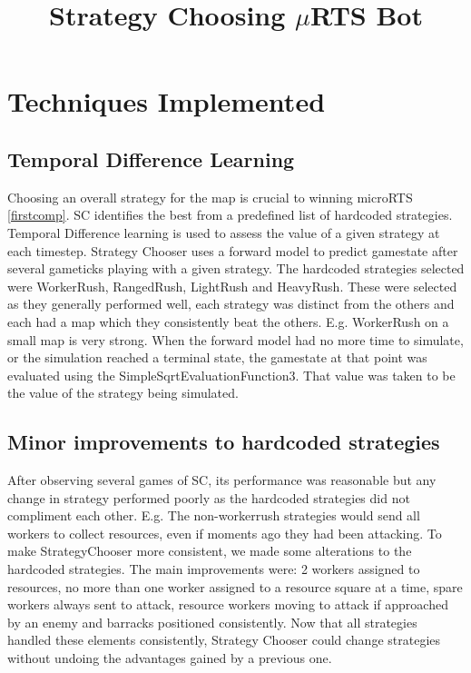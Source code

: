 \documentclass[]{article}
\title{Strategy Choosing $\mu$RTS Bot}
\author{}
\begin{document}
\maketitle

\begin{abstract}

\end{abstract}

\section{Techniques Implemented}


\subsection{Temporal Difference Learning}
Choosing an overall strategy for the map is crucial to winning microRTS \ref{firstcomp}. SC identifies the best from a predefined list of hardcoded strategies. Temporal Difference learning is used to assess the value of a given strategy at each timestep. Strategy Chooser uses a forward model to predict gamestate after several gameticks playing with a given strategy. The hardcoded strategies selected were WorkerRush, RangedRush, LightRush and HeavyRush. These were selected as they generally performed well, each strategy was distinct from the others and each had a map which they consistently beat the others. E.g. WorkerRush on a small map is very strong. When the forward model had no more time to simulate, or the simulation reached a terminal state, the gamestate at that point was evaluated using the SimpleSqrtEvaluationFunction3. That value was taken to be the value of the strategy being simulated.

\subsection{Minor improvements to hardcoded strategies}
After observing several games of SC, its performance was reasonable but any change in strategy performed poorly as the hardcoded strategies did not compliment each other. E.g. The non-workerrush strategies would send all workers to collect resources, even if moments ago they had been attacking. To make StrategyChooser more consistent, we made some alterations to the hardcoded strategies. The main improvements were: 2 workers assigned to resources, no more than one worker assigned to a resource square at a time, spare workers always sent to attack, resource workers moving to attack if approached by an enemy and barracks positioned consistently. Now that all strategies handled these elements consistently, Strategy Chooser could change strategies without undoing the advantages gained by a previous one. 
\end{document}
